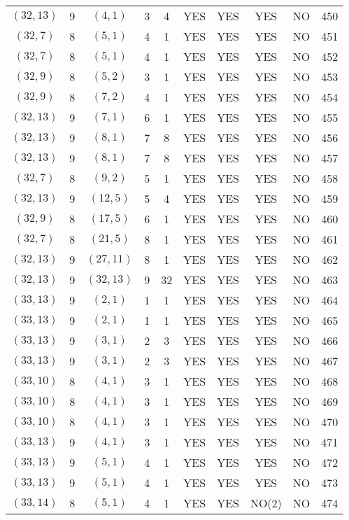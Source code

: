 \begin{longtable}{|c|c|c|c|c|c|c|c|c|c|}
$(32, 13)$ & 9 & $(4, 1)$ & 3 & 4 & YES & YES & YES & NO & 450\\
$(32, 7)$ & 8 & $(5, 1)$ & 4 & 1 & YES & YES & YES & NO & 451\\
$(32, 7)$ & 8 & $(5, 1)$ & 4 & 1 & YES & YES & YES & NO & 452\\
$(32, 9)$ & 8 & $(5, 2)$ & 3 & 1 & YES & YES & YES & NO & 453\\
$(32, 9)$ & 8 & $(7, 2)$ & 4 & 1 & YES & YES & YES & NO & 454\\
$(32, 13)$ & 9 & $(7, 1)$ & 6 & 1 & YES & YES & YES & NO & 455\\
$(32, 13)$ & 9 & $(8, 1)$ & 7 & 8 & YES & YES & YES & NO & 456\\
$(32, 13)$ & 9 & $(8, 1)$ & 7 & 8 & YES & YES & YES & NO & 457\\
$(32, 7)$ & 8 & $(9, 2)$ & 5 & 1 & YES & YES & YES & NO & 458\\
$(32, 13)$ & 9 & $(12, 5)$ & 5 & 4 & YES & YES & YES & NO & 459\\
$(32, 9)$ & 8 & $(17, 5)$ & 6 & 1 & YES & YES & YES & NO & 460\\
$(32, 7)$ & 8 & $(21, 5)$ & 8 & 1 & YES & YES & YES & NO & 461\\
$(32, 13)$ & 9 & $(27, 11)$ & 8 & 1 & YES & YES & YES & NO & 462\\
$(32, 13)$ & 9 & $(32, 13)$ & 9 & 32 & YES & YES & YES & NO & 463\\
$(33, 13)$ & 9 & $(2, 1)$ & 1 & 1 & YES & YES & YES & NO & 464\\
$(33, 13)$ & 9 & $(2, 1)$ & 1 & 1 & YES & YES & YES & NO & 465\\
$(33, 13)$ & 9 & $(3, 1)$ & 2 & 3 & YES & YES & YES & NO & 466\\
$(33, 13)$ & 9 & $(3, 1)$ & 2 & 3 & YES & YES & YES & NO & 467\\
$(33, 10)$ & 8 & $(4, 1)$ & 3 & 1 & YES & YES & YES & NO & 468\\
$(33, 10)$ & 8 & $(4, 1)$ & 3 & 1 & YES & YES & YES & NO & 469\\
$(33, 10)$ & 8 & $(4, 1)$ & 3 & 1 & YES & YES & YES & NO & 470\\
$(33, 13)$ & 9 & $(4, 1)$ & 3 & 1 & YES & YES & YES & NO & 471\\
$(33, 13)$ & 9 & $(5, 1)$ & 4 & 1 & YES & YES & YES & NO & 472\\
$(33, 13)$ & 9 & $(5, 1)$ & 4 & 1 & YES & YES & YES & NO & 473\\
$(33, 14)$ & 8 & $(5, 1)$ & 4 & 1 & YES & YES & NO(2) & NO & 474\\

\end{longtable}
